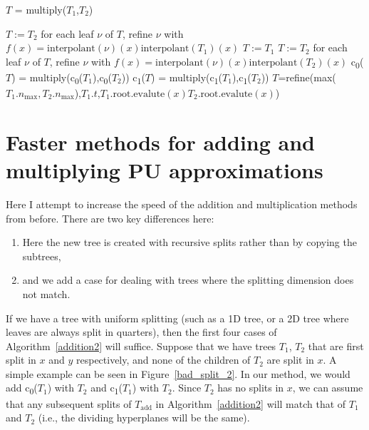 \documentclass{article}
\newcommand{\nmax}{n_{\text{max}}}
\newcommand{\child}[1]{c\textsubscript{#1}}
\begin{document}
\begin{algorithm}[!h]
\caption{$T$ = multiply($T_1$,$T_2$)}
\label{multiply}
\begin{algorithmic}
\STATE $T:=T_2$
\STATE for each leaf $\nu$ of $T$, refine $\nu$ with $f(x)=\text{interpolant}(\nu)(x)\text{interpolant}(T_1)(x)$
\STATE $T:=T_1$
\STATE $T:=T_2$
\STATE for each leaf $\nu$ of $T$, refine $\nu$ with $f(x)=\text{interpolant}(\nu)(x)\text{interpolant}(T_2)(x)$
\STATE \child{0}($T$) = multiply(\child{0}($T_1$),\child{0}($T_2$))
\STATE \child{1}($T$) = multiply(\child{1}($T_1$),\child{1}($T_2$))
\ELSE
\STATE $T$=refine(max($T_1.\nmax,T_2.\nmax$),$T_1.t$,$T_1.\text{root.evalute}(x)T_2.\text{root.evalute}(x)$)
\ENDIF
\end{algorithmic}
\end{algorithm}

\section{Faster methods for adding and multiplying PU approximations}

Here I attempt to increase the speed of the addition and multiplication methods from before. There are two key differences here:
\begin{enumerate}
\item Here the new tree is created with recursive splits rather than by copying the subtrees,
\item and we add a case for dealing with trees where the splitting dimension does not match.	
\end{enumerate}
If we have a tree with uniform splitting (such as a 1D tree, or a 2D tree where leaves are always split in quarters), then the first four cases of Algorithm~\ref{addition2} will suffice. Suppose that we have trees $T_1$, $T_2$ that are first split in $x$ and $y$ respectively, and none of the children of $T_2$ are split in $x$. A simple example can be seen in Figure~\ref{bad_split_2}. In our method, we would add \child{0}($T_1$) with $T_2$ and \child{1}($T_1$) with $T_2$. Since $T_2$ has no splits in $x$, we can assume that any subsequent splits of $T_{\mbox{add}}$ in Algorithm~\ref{addition2} will match that of $T_1$ and $T_2$ (i.e., the dividing hyperplanes will be the same). 
\end{document}
